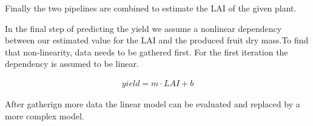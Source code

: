 \smallskip

\noindent
Finally the two pipelines are combined to estimate the LAI of the given plant.

\smallskip

\noindent
In the final step of predicting the yield we assume a nonlinear dependency between our estimated value for the LAI and the produced fruit dry mass.To find that non-linearity, data needs to be gathered first. For  the  first  iteration  the  dependency  is assumed to be linear. 

\begin{align}
    yield = m \cdot LAI + b
\end{align}

\noindent
After gatherign more data the linear model can be evaluated and replaced by a more complex model.
